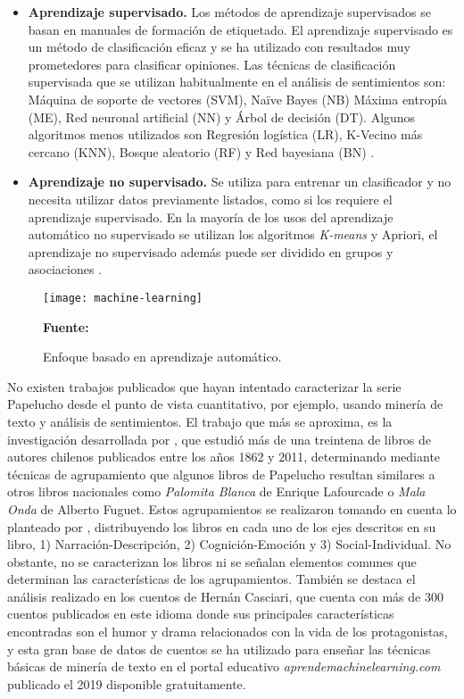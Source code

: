 \begin{enumerate}
    \begin{itemize}
        \item \textbf{Aprendizaje supervisado.} Los métodos de aprendizaje supervisados se basan en manuales de formación de etiquetado. El aprendizaje supervisado es un método de clasificación eficaz y se ha utilizado con resultados muy prometedores para clasificar opiniones. Las técnicas de clasificación supervisada que se utilizan habitualmente en el análisis de sentimientos son: Máquina de soporte de vectores (SVM), Naïve Bayes (NB) Máxima entropía (ME), Red neuronal artificial (NN) y Árbol de decisión (DT). Algunos algoritmos menos utilizados son Regresión logística (LR), K-Vecino más cercano (KNN), Bosque aleatorio (RF) y Red bayesiana (BN) \citep{aydougan2016comprehensive}.
        
        \item \textbf{Aprendizaje no supervisado.} Se utiliza para entrenar un clasificador y no necesita utilizar datos previamente listados, como si los requiere el aprendizaje supervisado. En la mayoría de los usos del aprendizaje automático no supervisado se utilizan los algoritmos \textit{K-means} y Apriori, el aprendizaje no supervisado además puede ser dividido en grupos y asociaciones \citep{ahmadmachine}.
\end{itemize}
\end{enumerate}

\begin{figure}[h]
    \texttt{[image: machine-learning]}
    \caption{Enfoque basado en aprendizaje automático.}
    \centering
    \textbf{Fuente:} \citep{medhat2014sentiment}
    \label{fig:machine-learning}
\end{figure}

No existen trabajos publicados que hayan intentado caracterizar la serie Papelucho desde el punto de vista cuantitativo, por ejemplo, usando  minería de texto y análisis de sentimientos. El trabajo que más se aproxima, es la investigación desarrollada por \citet{MARTINEZ-GAMBOA2015}, que estudió más de una treintena de libros de autores chilenos publicados entre los años 1862 y 2011, determinando mediante técnicas de agrupamiento que algunos libros de Papelucho resultan similares a otros libros nacionales como \textit{Palomita Blanca} de Enrique Lafourcade o \textit{Mala Onda} de Alberto Fuguet. Estos agrupamientos se realizaron tomando en cuenta lo planteado por \citet{biber1998corpus}, distribuyendo los libros en cada uno de los ejes descritos en su libro, 1) Narración-Descripción, 2) Cognición-Emoción y 3) Social-Individual. No obstante, no se caracterizan los libros ni se señalan elementos comunes que determinan las características de los agrupamientos. También se destaca el  análisis realizado en los cuentos de Hernán Casciari, que cuenta con más de 300 cuentos publicados en este idioma donde sus principales características encontradas son el humor y drama relacionados con la vida de los protagonistas, y esta gran base de datos de cuentos se ha utilizado para enseñar las técnicas básicas de minería de texto en el portal educativo \textit{aprendemachinelearning.com} publicado el 2019 disponible gratuitamente.

